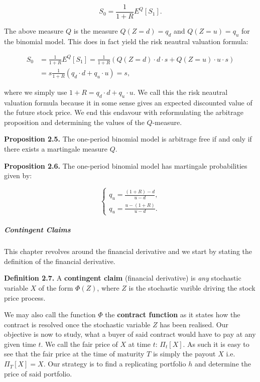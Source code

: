 \documentclass[
]{article}
\begin{document}
\[S_0=\frac{1}{1+R}E^Q[S_1].\]

The above measure \(Q\) is the measure \(Q(Z=d)=q_d\) and \(Q(Z=u)=q_u\)
for the binomial model. This does in fact yield the risk neautral
valuation formula:

\begin{align*}
S_0&=\frac{1}{1+R}E^Q[S_1]=\frac{1}{1+R}(Q(Z=d)\cdot d\cdot s+Q(Z=u)\cdot u\cdot s)\\
&=s\frac{1}{1+R}(q_d\cdot d+q_u\cdot u)=s,
\end{align*}

where we simply use \(1+R=q_d\cdot d+q_u\cdot u\). We call this the risk
neautral valuation formula because it in some sense gives an expected
discounted value of the future stock price. We end this endavour with
reformulating the arbitrage proposition and determining the values of
the \(Q\)-measure.

\textbf{Proposition 2.5.} The one-period binomial model is arbitrage
free if and only if there exists a martingale measure \(Q\).

\textbf{Proposition 2.6.} The one-period binomial model has martingale
probabilities given by:

\[\left\{\begin{matrix}q_u=\frac{(1+R)-d}{u-d},\\ q_u=\frac{u-(1+R)}{u-d}.\end{matrix}\right.\]

\hypertarget{contingent-claims}{%
\subparagraph{Contingent Claims}\label{contingent-claims}}

This chapter revolves around the financial derivative and we start by
stating the definition of the financial derivative.

\textbf{Definition 2.7.} A \textbf{contingent claim} (financial
derivative) is \emph{any} stochastic variable \(X\) of the form
\(\Phi(Z)\), where \(Z\) is the stochastic varible driving the stock
price process.

We may also call the function \(\Phi\) the \textbf{contract function} as
it states how the contract is resolved once the stochastic variable
\(Z\) has been realised. Our objective is now to study, what a buyer of
said contract would have to pay at any given time \(t\). We call the
fair price of \(X\) at time \(t\): \(\Pi_t[X]\). As such it is easy to
see that the fair price at the time of maturity \(T\) is simply the
payout \(X\) i.e.~\(\Pi_T[X]=X\). Our strategy is to find a replicating
portfolio \(h\) and determine the price of said portfolio.
\end{document}
